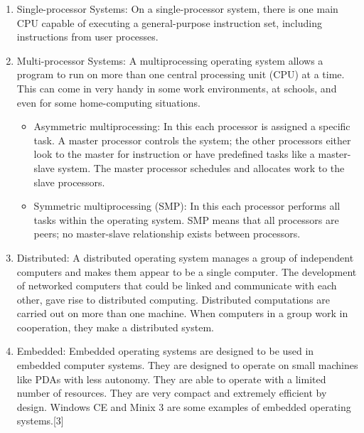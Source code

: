 \documentclass[11pt,a4paper]{article}
\begin{document}
\begin{enumerate}
	\item Single-processor Systems:  On a single-processor system, there is one main CPU capable of executing a general-purpose instruction set, including instructions from user processes.
	\item Multi-processor Systems:  A multiprocessing operating system allows a program to run on more than one central processing unit (CPU) at a time. This can come in very handy in some work environments, at schools, and even for some home-computing situations.
	\begin{itemize}
	\item Asymmetric multiprocessing:  In this each processor is assigned a specific task. A master processor controls the system; the other processors either look to the master for instruction or have predefined tasks like a master-slave system. The master processor schedules and allocates work to the slave processors.
	\item Symmetric multiprocessing (SMP):  In this each processor performs all tasks within the operating system. SMP means that all processors are peers; no master-slave relationship exists between processors.
	\end{itemize}
	\item Distributed:  A distributed operating system manages a group of independent computers and makes them appear to be a single computer. The development of networked computers that could be linked and communicate with each other, gave rise to distributed computing. Distributed computations are carried out on more than one machine. When computers in a group work in cooperation, they make a distributed system.
	\item Embedded: Embedded operating systems are designed to be used in embedded computer systems. They are designed to operate on small machines like PDAs with less autonomy. They are able to operate with a limited number of resources. They are very compact and extremely efficient by design. Windows CE and Minix 3 are some examples of embedded operating systems.[3]
	\end{enumerate}
	
	\newpage
\end{document}
